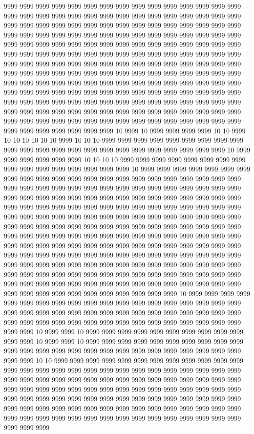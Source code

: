 9999 9999 9999 9999 9999 9999 9999 9999 9999 9999 9999 9999 9999 9999 9999 9999 9999 9999 9999 9999 9999 9999 9999 9999 9999 9999 9999 9999 9999 9999 9999 9999 9999 9999 9999 9999 9999 9999 9999 9999 9999 9999 9999 9999 9999 9999 9999 9999 9999 9999 9999 9999 9999 9999 9999 9999 9999 9999 9999 9999 9999 9999 9999 9999 9999 9999 9999 9999 9999 9999 9999 9999 9999 9999 9999 9999 9999 9999 9999 9999 9999 9999 9999 9999 9999 9999 9999 9999 9999 9999 9999 9999 9999 9999 9999 9999 9999 9999 9999 9999 9999 9999 9999 9999 9999 9999 9999 9999 9999 9999 9999 9999 9999 9999 9999 9999 9999 9999 9999 9999 9999 9999 9999 9999 9999 9999 9999 9999 9999 9999 9999 9999 9999 9999 9999 9999 9999 9999 9999 9999 9999 9999 9999 9999 9999 9999 9999 9999 9999 9999 9999 9999 9999 9999 9999 9999 9999 9999 9999 9999 9999 9999 9999 9999 9999 9999 9999 9999 9999 9999 9999 9999 9999 9999 9999 9999 9999 9999 9999 9999 9999 9999 9999 9999 9999 9999 9999 9999 9999 9999 9999 9999 9999 9999 9999 9999 9999 9999 9999 9999 9999 9999 10 9999 10 9999 9999 9999 9999 10 10 9999 10 10 10 10 10 10 9999 10 10 10 9999 9999 9999 9999 9999 9999 9999 9999 9999 9999 9999 9999 9999 9999 9999 9999 9999 9999 9999 9999 9999 9999 9999 10 9999 9999 9999 9999 9999 9999 10 10 10 10 9999 9999 9999 9999 9999 9999 9999 9999 9999 9999 9999 9999 9999 9999 9999 9999 10 9999 9999 9999 9999 9999 9999 9999 9999 9999 9999 9999 9999 9999 9999 9999 9999 9999 9999 9999 9999 9999 9999 9999 9999 9999 9999 9999 9999 9999 9999 9999 9999 9999 9999 9999 9999 9999 9999 9999 9999 9999 9999 9999 9999 9999 9999 9999 9999 9999 9999 9999 9999 9999 9999 9999 9999 9999 9999 9999 9999 9999 9999 9999 9999 9999 9999 9999 9999 9999 9999 9999 9999 9999 9999 9999 9999 9999 9999 9999 9999 9999 9999 9999 9999 9999 9999 9999 9999 9999 9999 9999 9999 9999 9999 9999 9999 9999 9999 9999 9999 9999 9999 9999 9999 9999 9999 9999 9999 9999 9999 9999 9999 9999 9999 9999 9999 9999 9999 9999 9999 9999 9999 9999 9999 9999 9999 9999 9999 9999 9999 9999 9999 9999 9999 9999 9999 9999 9999 9999 9999 9999 9999 9999 9999 9999 9999 9999 9999 9999 9999 9999 9999 9999 9999 9999 9999 9999 9999 9999 9999 9999 9999 9999 9999 9999 9999 9999 9999 9999 9999 9999 9999 9999 9999 9999 9999 9999 9999 9999 9999 9999 9999 9999 9999 9999 9999 9999 9999 9999 9999 9999 9999 9999 9999 9999 9999 9999 9999 10 9999 9999 9999 9999 9999 9999 9999 9999 9999 9999 9999 9999 9999 9999 9999 9999 9999 9999 9999 9999 9999 9999 9999 9999 9999 9999 9999 9999 9999 9999 9999 9999 9999 9999 9999 9999 9999 9999 9999 9999 9999 9999 9999 9999 9999 9999 9999 9999 9999 9999 9999 10 9999 9999 10 9999 9999 9999 9999 9999 9999 9999 9999 9999 9999 9999 9999 10 9999 9999 10 9999 9999 9999 9999 9999 9999 9999 9999 9999 9999 9999 9999 9999 9999 9999 9999 9999 9999 9999 9999 9999 9999 9999 9999 9999 9999 9999 10 10 9999 9999 9999 9999 9999 9999 9999 9999 9999 9999 9999 9999 9999 9999 9999 9999 9999 9999 9999 9999 9999 9999 9999 9999 9999 9999 9999 9999 9999 9999 9999 9999 9999 9999 9999 9999 9999 9999 9999 9999 9999 9999 9999 9999 9999 9999 9999 9999 9999 9999 9999 9999 9999 9999 9999 9999 9999 9999 9999 9999 9999 9999 9999 9999 9999 9999 9999 9999 9999 9999 9999 9999 9999 9999 9999 9999 9999 9999 9999 9999 9999 9999 9999 9999 9999 9999 9999 9999 9999 9999 9999 9999 9999 9999 9999 9999 9999 9999 9999 9999 9999 9999 9999 9999 9999 